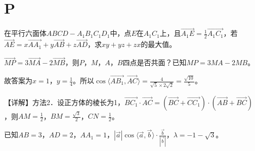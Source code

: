 \documentclass[fontset=none]{ctexart}
\begin{document}
\section*{P\PROBETAG}
\noindent 在平行六面体\(ABCD-A_1B_1C_1D_1\)中，点\(E\)在\(A_1C_1\)上，且\(\overrightarrow{A_1E}=\frac{1}{2}\overrightarrow{A_1C_1}\)，若\(\overrightarrow{AE}=x\overrightarrow{AA_1}+y\overrightarrow{AB}+z\overrightarrow{AD}\)，求\(xy+yz+zx\)的最大值。

\noindent \(\overrightarrow{MP}=3\overrightarrow{MA}-2\overrightarrow{MB}\)，则\(P\)，\(M\)，\(A\)，\(B\)四点是否共面？已知\(MP=3MA-2MB\)。

\noindent 故答案为\(x=1\)，\(y=\frac{1}{4}\)。所以\(\cos\langle \overrightarrow{AB_1},\overrightarrow{AC}\rangle=\frac{4}{\sqrt{5}\times2\sqrt{2}}=\frac{\sqrt{10}}{5}\)。

\noindent 【详解】方法2．设正方体的棱长为1，\(\overrightarrow{BC_{1}} \cdot \overrightarrow{AC} = ( \overrightarrow{BC} + \overrightarrow{CC_{1}} ) \cdot ( \overrightarrow{AB} + \overrightarrow{BC} )\)，则\(AM = \frac{1}{2}\)，\(BM = \frac{\sqrt{3}}{2}\)，\(CN = \frac{1}{2}\)。

\noindent 已知\(AB=3\)，\(AD=2\)，\(AA_1=1\)，\(| \overrightarrow{a} |\cos\langle \overrightarrow{a},\overrightarrow{b} \rangle \cdot \frac{\overrightarrow{b}}{| \overrightarrow{b} |}\)，\(\lambda=-1-\sqrt{3}\)。
\end{document}
